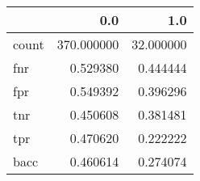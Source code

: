 \begin{tabular}{lrr}
\toprule
{} &         0.0 &        1.0 \\
\midrule
count &  370.000000 &  32.000000 \\
fnr   &    0.529380 &   0.444444 \\
fpr   &    0.549392 &   0.396296 \\
tnr   &    0.450608 &   0.381481 \\
tpr   &    0.470620 &   0.222222 \\
bacc  &    0.460614 &   0.274074 \\
\bottomrule
\end{tabular}
